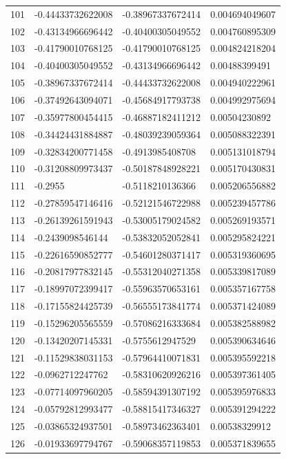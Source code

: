 \documentclass{amsart}
\numberwithin{equation}{section}
\numberwithin{table}{section}
\begin{document}
\begin{longtable}{@{}rlll@{}}
101 & -0.44433732622008 & -0.38967337672414 & 0.004694049607 \\
102 & -0.43134966696442 & -0.40400305049552 & 0.004760895309 \\
103 & -0.41790010768125 & -0.41790010768125 & 0.004824218204 \\
104 & -0.40400305049552 & -0.43134966696442 & 0.00488399491 \\
105 & -0.38967337672414 & -0.44433732622008 & 0.004940222961 \\
106 & -0.37492643094071 & -0.45684917793738 & 0.004992975694 \\
107 & -0.35977800454415 & -0.46887182411212 & 0.00504230892 \\
108 & -0.34424431884887 & -0.48039239059364 & 0.005088322391 \\
109 & -0.32834200771458 & -0.4913985408708 & 0.005131018794 \\
110 & -0.31208809973437 & -0.50187848928221 & 0.005170430831 \\
111 & -0.2955 & -0.5118210136366 & 0.005206556882 \\
112 & -0.27859547146416 & -0.52121546722988 & 0.005239457786 \\
113 & -0.26139261591943 & -0.53005179024582 & 0.005269193571 \\
114 & -0.2439098546144 & -0.53832052052841 & 0.005295824221 \\
115 & -0.22616590852777 & -0.54601280371417 & 0.005319360695 \\
116 & -0.20817977832145 & -0.55312040271358 & 0.005339817089 \\
117 & -0.18997072399417 & -0.55963570653161 & 0.005357167758 \\
118 & -0.17155824425739 & -0.56555173841774 & 0.005371424089 \\
119 & -0.15296205565559 & -0.57086216333684 & 0.005382588982 \\
120 & -0.13420207145331 & -0.5755612947529 & 0.005390634646 \\
121 & -0.11529838031153 & -0.57964410071831 & 0.005395592218 \\
122 & -0.0962712247762 & -0.58310620926216 & 0.005397361405 \\
123 & -0.07714097960205 & -0.58594391307192 & 0.005395976833 \\
124 & -0.05792812993477 & -0.58815417346327 & 0.005391294222 \\
125 & -0.03865324937501 & -0.58973462363401 & 0.00538329912 \\
126 & -0.01933697794767 & -0.59068357119853 & 0.005371839655 \\

\end{longtable}
\end{document}
